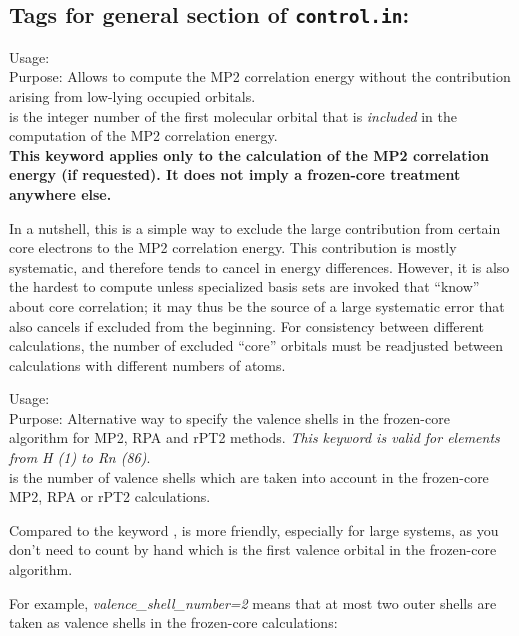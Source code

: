 \subsection*{Tags for general section of \texttt{control.in}:}

{
  \noindent
  Usage:   \\[1.0ex]
  Purpose: Allows to compute the MP2 correlation energy without the
    contribution arising from low-lying occupied orbitals. \\[1.0ex]
   is the integer number of the first molecular
    orbital that is \emph{included} in the computation of the MP2
    correlation energy. \\
}
\textbf{This keyword applies only to the calculation of the MP2
  correlation energy (if requested). It does not imply a frozen-core
  treatment anywhere else.}

In a nutshell, this is a simple way to exclude the large contribution
from certain core electrons to the MP2 correlation energy. This
contribution is mostly systematic, and therefore tends to cancel in
energy differences. However, it is also the hardest to compute unless
specialized basis sets are invoked that ``know'' about core
correlation; it may thus be the source of a large systematic error
that also cancels if excluded from the beginning. For consistency
between different calculations, the number of excluded ``core''
orbitals must be readjusted between calculations with different
numbers of atoms.

{
  \noindent
  Usage:   \\[1.0ex]
  Purpose: Alternative way to specify the valence shells in the frozen-core algorithm for MP2, RPA and
  rPT2 methods. \textit{This keyword is valid for elements from H (1) to Rn (86)}.\\[1.0ex]
   is the number of valence shells which are taken into account  
  in the frozen-core MP2, RPA or rPT2 calculations.\\
}

Compared to the keyword ,  is more friendly, especially for
large systems, as you don't need to count by hand which is the first valence orbital in the frozen-core algorithm.

For example, \emph{valence\_shell\_number=2} means that at most two outer shells are taken as
valence shells in the frozen-core calculations:

